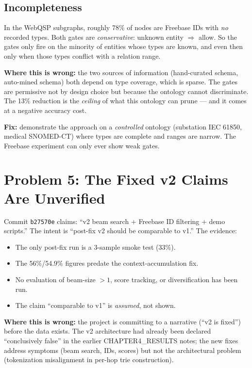 \documentclass[11pt,a4paper]{article}
\begin{document}
\subsection{Incompleteness}
In the WebQSP subgraphs, roughly 78\% of nodes are Freebase IDs with
\emph{no} recorded types.  Both gates are \emph{conservative}:
unknown entity $\Rightarrow$ allow.  So the gates only fire on the
minority of entities whose types are known, and even then only when
those types conflict with a relation range.

\textbf{Where this is wrong:} the two sources of information
(hand-curated schema, auto-mined schema) both depend on type coverage,
which is sparse.  The gates are permissive not by design choice but
because the ontology cannot discriminate.  The 13\% reduction is the
\emph{ceiling} of what this ontology can prune --- and it comes at a
negative accuracy cost.

\textbf{Fix:} demonstrate the approach on a \emph{controlled} ontology
(substation IEC 61850, medical SNOMED-CT) where types are complete and
ranges are narrow.  The Freebase experiment can only ever show weak
gates.

\section{Problem 5: The Fixed v2 Claims Are Unverified}

Commit \texttt{b27570e} claims: ``v2 beam search + Freebase ID
filtering + demo scripts.''  The intent is ``post-fix v2 should be
comparable to v1.''  The evidence:

\begin{itemize}
  \item The only post-fix run is a 3-sample smoke test (33\%).
  \item The 56\%/54.9\% figures predate the context-accumulation fix.
  \item No evaluation of beam-size $>1$, score tracking, or
    diversification has been run.
  \item The claim ``comparable to v1'' is \emph{assumed}, not shown.
\end{itemize}

\textbf{Where this is wrong:} the project is committing to a narrative
(``v2 is fixed'') before the data exists.  The v2 architecture had
already been declared ``conclusively false'' in the earlier
CHAPTER4\_RESULTS notes; the new fixes address symptoms
(beam search, IDs, scores) but not the architectural problem
(tokenization misalignment in per-hop trie construction).
\end{document}
